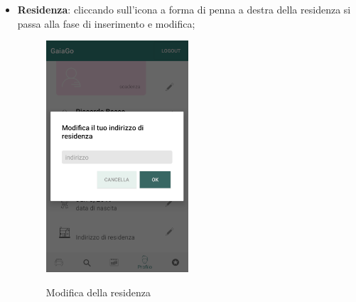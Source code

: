 \begin{itemize}
\item \textbf{Residenza}: cliccando sull'icona a forma di penna a destra della residenza si passa alla fase di inserimento e modifica;
\begin{figure}[H] 
	\centering 
	\includegraphics[width=0.5\textwidth]{res/images/modifica_residenza.png}\\
	\caption{Modifica della residenza}
	\label{modifiresidenza}
\end{figure}
\pagebreak
\end{itemize}

